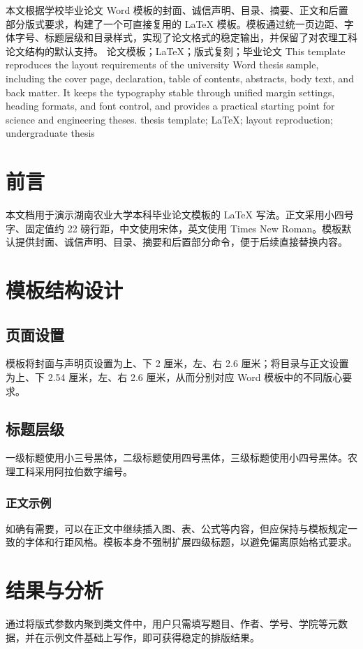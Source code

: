 \documentclass[science]{hnau-thesis}
\begin{document}
\makecover
\makestatement
\maketoc

\makeabstracts
{本文根据学校毕业论文 Word 模板的封面、诚信声明、目录、摘要、正文和后置部分版式要求，构建了一个可直接复用的 LaTeX 模板。模板通过统一页边距、字体字号、标题层级和目录样式，实现了论文格式的稳定输出，并保留了对农理工科论文结构的默认支持。}
{论文模板；LaTeX；版式复刻；毕业论文}
{This template reproduces the layout requirements of the university Word thesis sample, including the cover page, declaration, table of contents, abstracts, body text, and back matter. It keeps the typography stable through unified margin settings, heading formats, and font control, and provides a practical starting point for science and engineering theses.}
{thesis template; LaTeX; layout reproduction; undergraduate thesis}

\section{前言}
本文档用于演示湖南农业大学本科毕业论文模板的 LaTeX 写法。正文采用小四号字、固定值约 22 磅行距，中文使用宋体，英文使用 Times New Roman。模板默认提供封面、诚信声明、目录、摘要和后置部分命令，便于后续直接替换内容。

\section{模板结构设计}
\subsection{页面设置}
模板将封面与声明页设置为上、下 2 厘米，左、右 2.6 厘米；将目录与正文设置为上、下 2.54 厘米，左、右 2.6 厘米，从而分别对应 Word 模板中的不同版心要求。

\subsection{标题层级}
一级标题使用小三号黑体，二级标题使用四号黑体，三级标题使用小四号黑体。农理工科采用阿拉伯数字编号。

\subsubsection{正文示例}
如确有需要，可以在正文中继续插入图、表、公式等内容，但应保持与模板规定一致的字体和行距风格。模板本身不强制扩展四级标题，以避免偏离原始格式要求。

\section{结果与分析}
通过将版式参数内聚到类文件中，用户只需填写题目、作者、学号、学院等元数据，并在示例文件基础上写作，即可获得稳定的排版结果。
\end{document}
